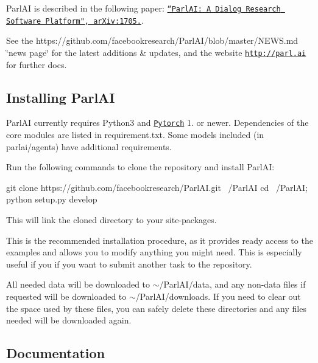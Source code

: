Parl\+AI is described in the following paper\+: \href{https://arxiv.org/abs/1705.06476}{\tt “\+Parl\+A\+I\+: A Dialog Research Software Platform", ar\+Xiv\+:1705.}.

See the https\+://github.com/facebookresearch/\+Parl\+A\+I/blob/master/\+N\+E\+W\+S.\+md \char`\"{}news page\char`\"{} for the latest additions \& updates, and the website \href{http://parl.ai}{\tt http\+://parl.\+ai} for further docs.

\subsection*{Installing Parl\+AI}

Parl\+AI currently requires Python3 and \href{https://pytorch.org}{\tt Pytorch} 1. or newer. Dependencies of the core modules are listed in {\ttfamily requirement.\+txt}. Some models included (in {\ttfamily parlai/agents}) have additional requirements.

Run the following commands to clone the repository and install Parl\+AI\+:


\begin{DoxyCode}
git clone https://github.com/facebookresearch/ParlAI.git ~/ParlAI
cd ~/ParlAI; python setup.py develop
\end{DoxyCode}


This will link the cloned directory to your site-\/packages.

This is the recommended installation procedure, as it provides ready access to the examples and allows you to modify anything you might need. This is especially useful if you if you want to submit another task to the repository.

All needed data will be downloaded to {\ttfamily $\sim$/\+Parl\+A\+I/data}, and any non-\/data files if requested will be downloaded to {\ttfamily $\sim$/\+Parl\+A\+I/downloads}. If you need to clear out the space used by these files, you can safely delete these directories and any files needed will be downloaded again.

\subsection*{Documentation}


